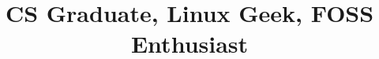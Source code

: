 \documentclass[10pt, a4paper]{moderncv}
\title{CS Graduate, Linux Geek, FOSS Enthusiast}
\begin{document}
\maketitle

\\



\end{document}
